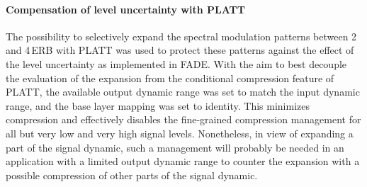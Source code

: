 \documentclass[10pt,a4paper,twocolumn]{article}
\begin{document}
\paragraph{Compensation of level uncertainty with PLATT}
%
The possibility to selectively expand the spectral modulation patterns between 2 and 4\,ERB with PLATT was used to protect these patterns against the effect of the level uncertainty as implemented in FADE.
%
With the aim to best decouple the evaluation of the expansion from the conditional compression feature of PLATT, the available output dynamic range was set to match the input dynamic range, and the base layer mapping was set to identity.
%
This minimizes compression and effectively disables the fine-grained compression management for all but very low and very high signal levels.
%
Nonetheless, in view of expanding a part of the signal dynamic, such a management will probably be needed in an application with a limited output dynamic range to counter the expansion with a possible compression of other parts of the signal dynamic.
\end{document}
